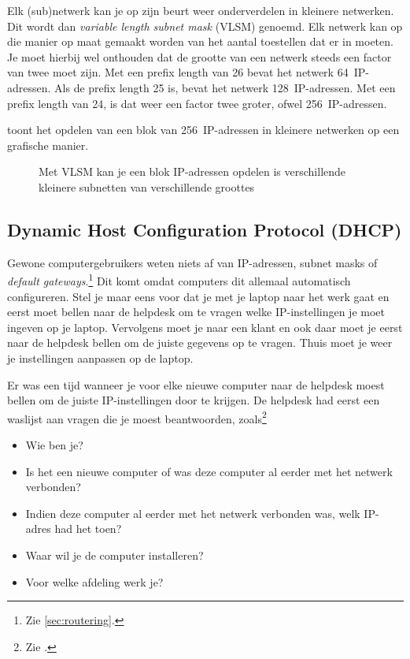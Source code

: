 Elk (sub)netwerk kan je op zijn beurt weer onderverdelen in kleinere netwerken.
Dit wordt dan \emph{variable length subnet mask} (VLSM) genoemd.
Elk netwerk kan op die manier op maat gemaakt worden van het aantal toestellen dat er in moeten.
Je moet hierbij wel onthouden dat de grootte van een netwerk steeds een factor van twee moet zijn.
Met een prefix length van 26 bevat het netwerk 64~IP-adressen.
Als de prefix length 25 is, bevat het netwerk 128~IP-adressen.
Met een prefix length van 24, is dat weer een factor twee groter, ofwel 256~IP-adressen.

 toont het opdelen van een blok van 256~IP-adressen in kleinere netwerken op een grafische manier.


\begin{figure}[hbp]
   \centering
   \caption{Met VLSM kan je een blok IP-adressen opdelen is verschillende kleinere subnetten van verschillende groottes}
   \label{fig:vlsm}
\end{figure}



\subsection{Dynamic Host Configuration Protocol (DHCP)}
\label{sec:dhcp}

Gewone computergebruikers weten niets af van IP-adressen, subnet masks of \emph{default gateways}.\footnote{Zie \vref{sec:routering}.}
Dit komt omdat computers dit allemaal automatisch configureren.
Stel je maar eens voor dat je met je laptop naar het werk gaat en eerst moet bellen naar de helpdesk om te vragen welke IP-instellingen je moet ingeven op je laptop.
Vervolgens moet je naar een klant en ook daar moet je eerst naar de helpdesk bellen om de juiste gegevens op te vragen.
Thuis moet je weer je instellingen aanpassen op de laptop.

Er was een tijd wanneer je voor elke nieuwe computer naar de helpdesk moest bellen om de juiste IP-instellingen door te krijgen.
De helpdesk had eerst een waslijst aan vragen die je moest beantwoorden, zoals\footnote{Zie \cite[4]{droms02}.}
\begin{itemize}
\item Wie ben je?
\item Is het een nieuwe computer of was deze computer al eerder met het netwerk verbonden?
\item Indien deze computer al eerder met het netwerk verbonden was, welk IP-adres had het toen?
\item Waar wil je de computer installeren?
\item Voor welke afdeling werk je?
\end{itemize}

